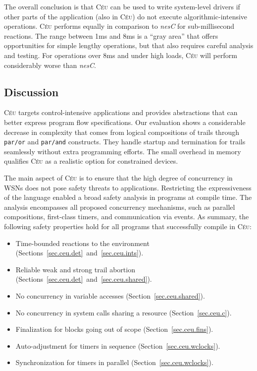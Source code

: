 \documentclass[10pt]{sensys-proc}
\newcommand{\CEU}{\textsc{C\'{e}u}\xspace}
\newcommand{\code}[1] {{\small{\texttt{#1}}}}
\begin{document}

The overall conclusion is that \CEU can be used to write system-level drivers 
if other parts of the application (also in \CEU) do not execute 
algorithmic-intensive operations.
%
\CEU performs equally in comparison to \emph{nesC} for sub-millisecond 
reactions.
%
The range between 1ms and 8ms is a ``gray area'' that offers opportunities for 
simple lengthy operations, but that also requires careful analysis and testing.
%
For operations over 8ms and under high loads, \CEU will perform considerably 
worse than \emph{nesC}.

\subsection{Discussion}

\CEU targets control-intensive applications and provides abstractions that can 
better express program flow specifications.
%
Our evaluation shows a considerable decrease in complexity that comes from 
logical compositions of trails through \code{par/or} and \code{par/and} 
constructs.
%
They handle startup and termination for trails seamlessly without extra 
programming efforts.
%
The small overhead in memory qualifies \CEU as a realistic option for 
constrained devices.

%

The main aspect of \CEU is to ensure that the high degree of concurrency in 
WSNs does not pose safety threats to applications.
Restricting the expressiveness of the language enabled a broad safety analysis 
in programs at compile time.
The analysis encompasses all proposed concurrency mechanisms, such as parallel 
compositions, first-class timers, and communication via events.
As summary, the following safety properties hold for all programs that 
successfully compile in \CEU:

\begin{itemize}
\item Time-bounded reactions to the environment
        (Sections~\ref{sec.ceu.det}~and~\ref{sec.ceu.ints}).
\item Reliable weak and strong trail abortion
        (Sections~\ref{sec.ceu.det}~and~\ref{sec.ceu.shared}).
\item No concurrency in variable accesses
        (Section~\ref{sec.ceu.shared}).
\item No concurrency in system calls sharing a resource
        (Section~\ref{sec.ceu.c}).
\item Finalization for blocks going out of scope
        (Section~\ref{sec.ceu.fins}).
\item Auto-adjustment for timers in sequence
        (Section~\ref{sec.ceu.wclocks}).
\item Synchronization for timers in parallel
        (Section~\ref{sec.ceu.wclocks}).
\end{itemize}
\end{document}
